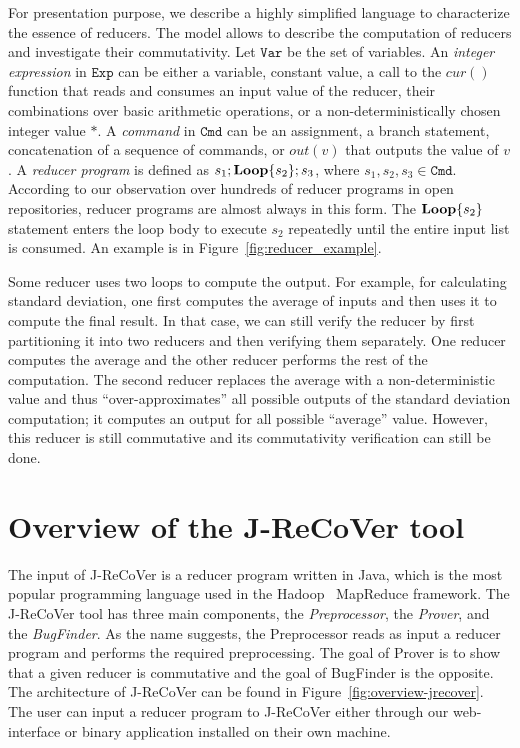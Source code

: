 \documentclass{llncs}
\newcommand{\Var}{\mathtt{Var}}
\newcommand{\Exp}{\mathtt{Exp}}
\newcommand{\Cmd}{\mathtt{Cmd}}
\newcommand{\cur}{cur()}
\newcommand{\rloop}{
	\ifmmode
	\mathbf{Loop}
	\else
	\textbf{Loop}
	\fi}
\begin{document}
For presentation purpose, we describe a highly simplified language to characterize the essence of reducers. The model allows to describe the computation of reducers and investigate their commutativity.
Let $\Var$ be the set of variables. An \emph{integer expression} in $\Exp$ can be either a variable, constant value, a call to the $\cur$ function that reads and consumes an input value of the reducer, their combinations over basic arithmetic operations, or a non-deterministically chosen integer value $*$.
A \emph{command} in $\Cmd$ can be an assignment, a branch statement, concatenation of a sequence of commands, or $out(v)$ that outputs the value of $v$.
A \emph{reducer program} is defined as $s_1;\rloop\{s_2\};s_3$, where $s_1,s_2,s_3 \in \Cmd$. According to our observation over hundreds  of reducer programs in open repositories, reducer programs are almost always in this form. The $\rloop\{s_2\}$ statement enters the loop body to execute $s_2$ repeatedly until the entire input list is consumed. An example is in Figure~\ref{fig:reducer_example}.

Some reducer uses two loops to compute the output. For example, for calculating standard deviation, one first computes the average of inputs and then uses it to compute the final result. In that case, we can still verify the reducer by first partitioning it into two reducers and then verifying them separately. One reducer computes the average and the other reducer performs the rest of the computation.
The second reducer replaces the average with a non-deterministic value and thus ``over-approximates''  all possible outputs of the standard deviation computation; it computes an output for all possible ``average'' value. However, this reducer is still commutative and its commutativity verification can still be done.

\section{Overview of the J-ReCoVer tool}
\label{sec:overview}
The input of J-ReCoVer is a reducer program written in Java, which is the most popular programming language used in the Hadoop~\cite{hadoop} MapReduce framework.
The J-ReCoVer tool has three main components, the \emph{Preprocessor}, the \emph{Prover}, and the \emph{BugFinder}. As the name suggests, the Preprocessor reads as input a reducer program and performs the required preprocessing.  The goal of Prover is to show that a given reducer is commutative and the goal of BugFinder is the opposite. The architecture of J-ReCoVer can be found in Figure~\ref{fig:overview-jrecover}. The user can input a reducer program to J-ReCoVer either through our web-interface or binary application installed on their own machine.
\end{document}
